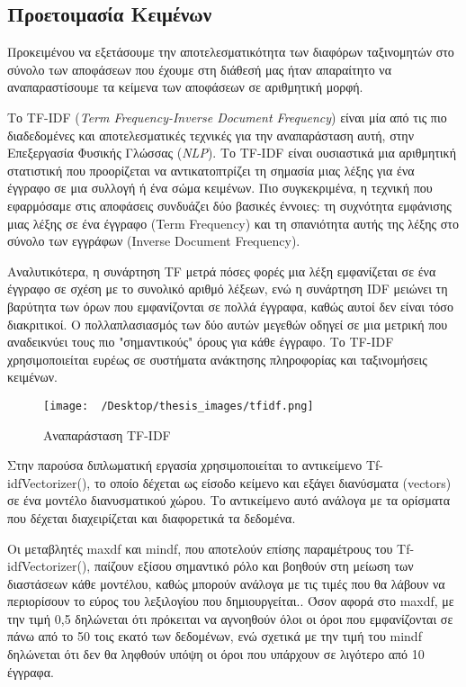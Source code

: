 \documentclass[diploma]{softlab-thesis}
\begin{document}
\begin{enumerate}
\begin{enumerate}
\section{Προετοιμασία Κειμένων}

Προκειμένου να εξετάσουμε την αποτελεσματικότητα των διαφόρων ταξινομητών στο σύνολο των αποφάσεων που έχουμε στη διάθεσή μας ήταν απαραίτητο να αναπαραστίσουμε τα κείμενα των αποφάσεων σε αριθμητική μορφή.

Το TF-IDF (\textit{Term Frequency-Inverse Document Frequency}) είναι μία από τις πιο διαδεδομένες και αποτελεσματικές τεχνικές για την αναπαράσταση αυτή, στην Επεξεργασία Φυσικής Γλώσσας (\textit{NLP}). Το TF-IDF είναι ουσιαστικά μια αριθμητική στατιστική που προορίζεται να αντικατοπτρίζει τη σημασία μιας λέξης για ένα έγγραφο σε μια συλλογή ή ένα σώμα κειμένων. Πιο συγκεκριμένα, η τεχνική που εφαρμόσαμε στις αποφάσεις συνδυάζει δύο βασικές έννοιες: τη συχνότητα εμφάνισης μιας λέξης σε ένα έγγραφο (Term Frequency) και τη σπανιότητα αυτής της λέξης στο σύνολο των εγγράφων (Inverse Document Frequency).

Αναλυτικότερα, η συνάρτηση TF μετρά πόσες φορές μια λέξη εμφανίζεται σε ένα έγγραφο σε σχέση με το συνολικό αριθμό λέξεων, ενώ η συνάρτηση IDF μειώνει τη βαρύτητα των όρων που εμφανίζονται σε πολλά έγγραφα, καθώς αυτοί δεν είναι τόσο διακριτικοί. Ο πολλαπλασιασμός των δύο αυτών μεγεθών οδηγεί σε μια μετρική που αναδεικνύει τους πιο "σημαντικούς" όρους για κάθε έγγραφο. Το TF-IDF χρησιμοποιείται ευρέως σε συστήματα ανάκτησης πληροφορίας και ταξινομήσεις κειμένων.

\begin{figure}[h]
    \centering
    \texttt{[image: ~/Desktop/thesis\_images/tfidf.png]} %
    \caption{Αναπαράσταση TF-IDF}
    \label{fig:your_image_label}
\end{figure}


Στην παρούσα διπλωματική εργασία χρησιμοποιείται το αντικείμενο Tf-idfVectorizer(), το οποίο δέχεται ως είσοδο κείμενο και εξάγει διανύσματα (vectors) σε ένα μοντέλο διανυσματικού χώρου. Το αντικείμενο αυτό ανάλογα με τα ορίσματα που δέχεται διαχειρίζεται και διαφορετικά τα δεδομένα. 


Οι μεταβλητές maxdf και mindf, που αποτελούν επίσης παραμέτρους του Tf-idfVectorizer(), παίζουν εξίσου σημαντικό ρόλο και βοηθούν στη μείωση των διαστάσεων κάθε μοντέλου, καθώς μπορούν ανάλογα με τις τιμές που θα λάβουν να περιορίσουν το εύρος του λεξιλογίου που δημιουργείται.. Όσον αφορά στο maxdf, με την τιμή 0,5 δηλώνεται ότι πρόκειται να αγνοηθούν όλοι οι όροι που εμφανίζονται σε πάνω από το 50 τοις εκατό των δεδομένων, ενώ σχετικά με την τιμή του mindf δηλώνεται ότι δεν θα ληφθούν υπόψη οι όροι που υπάρχουν σε λιγότερο από 10 έγγραφα.




\end{enumerate}
\end{enumerate}
\end{document}
